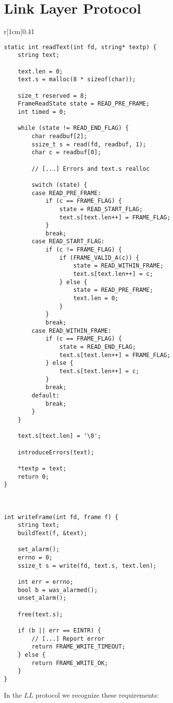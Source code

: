 \documentclass[main.tex]{subfiles}
\begin{document}
\section{Link Layer Protocol}
\label{sec:llprotocol}

\begin{wrapfigure}[40]{r}[1cm]{0.41\textwidth}
\begin{lstlisting}[style=rcom]
static int readText(int fd, string* textp) {
	string text;
	
	text.len = 0;
	text.s = malloc(8 * sizeof(char));
	
	size_t reserved = 8;
	FrameReadState state = READ_PRE_FRAME;
	int timed = 0;
	
	while (state != READ_END_FLAG) {
		char readbuf[2];
		ssize_t s = read(fd, readbuf, 1);
		char c = readbuf[0];
		
		// [...] Errors and text.s realloc

		switch (state) {
		case READ_PRE_FRAME:
			if (c == FRAME_FLAG) {
				state = READ_START_FLAG;
				text.s[text.len++] = FRAME_FLAG;
			}
			break;
		case READ_START_FLAG:
			if (c != FRAME_FLAG) {
				if (FRAME_VALID_A(c)) {
					state = READ_WITHIN_FRAME;
					text.s[text.len++] = c;
				} else {
					state = READ_PRE_FRAME;
					text.len = 0;
				}
			}
			break;
		case READ_WITHIN_FRAME:
			if (c == FRAME_FLAG) {
				state = READ_END_FLAG;
				text.s[text.len++] = FRAME_FLAG;
			} else {
				text.s[text.len++] = c;
			}
			break;
		default:
			break;
		}
	}

	text.s[text.len] = '\0';
	
	introduceErrors(text);
	
	*textp = text;
	return 0;
}



int writeFrame(int fd, frame f) {
	string text;
	buildText(f, &text);
	
	set_alarm();
	errno = 0;
	ssize_t s = write(fd, text.s, text.len);
	
	int err = errno;
	bool b = was_alarmed();
	unset_alarm();
	
	free(text.s);
	
	if (b || err == EINTR) {
		// [...] Report error
		return FRAME_WRITE_TIMEOUT;
	} else {
		return FRAME_WRITE_OK;
	}
}
\end{lstlisting}
\end{wrapfigure}

In the $LL$ protocol we recognize these requirements:
\end{document}
